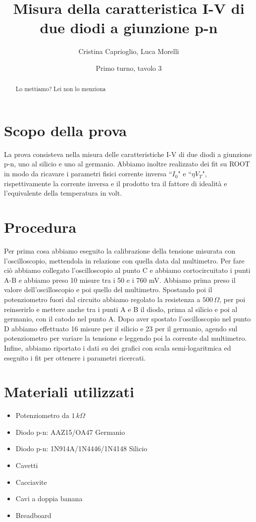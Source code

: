 \documentclass[]{article}
\title{Misura della caratteristica I-V di due diodi a giunzione p-n}
\author{Cristina Caprioglio, Luca Morelli}
\date{Primo turno, tavolo 3}
\begin{document}
\maketitle

\begin{abstract}
Lo mettiamo? Lei non lo menziona
\end{abstract}

\section{Scopo della prova}
La prova consisteva nella misura delle caratteristiche I-V di due diodi a giunzione p-n, uno al silicio e uno al germanio. Abbiamo inoltre realizzato dei fit su ROOT in modo da ricavare i parametri fisici corrente inversa ``$  I_{0}$" e ``$\eta V_{T}$", rispettivamente la corrente inversa e il prodotto tra il fattore di idealità e l'equivalente della temperatura in volt. 
\section{Procedura}
Per prima cosa abbiamo eseguito la calibrazione della tensione misurata con l'oscilloscopio, mettendola in relazione con quella data dal multimetro. Per fare ciò abbiamo collegato l'oscilloscopio al punto C e abbiamo cortocircuitato i punti A-B e abbiamo preso 10 misure tra i 50 e i 760 mV. Abbiamo prima preso il valore dell'oscilloscopio e poi quello del multimetro.
Spostando poi il potenziometro fuori dal circuito abbiamo regolato la resistenza a $ 500 \,\Omega $, per poi reinserirlo e mettere anche tra i punti A e B il diodo, prima al silicio e poi al germanio, con il catodo nel punto A. Dopo aver spostato l'oscilloscopio nel punto D abbiamo effettuato 16 misure per il silicio e 23 per il germanio, agendo sul potenziometro per variare la tensione e leggendo poi la corrente dal multimetro. Infine, abbiamo riportato i dati su dei grafici con scala semi-logaritmica ed eseguito i fit per ottenere i parametri ricercati.
\section{Materiali utilizzati}
\begin{itemize}
	\item Potenziometro da $ 1 \,k\Omega $
	\item Diodo p-n: AAZ15/OA47 Germanio
	\item Diodo p-n: 1N914A/1N4446/1N4148 Silicio
	\item Cavetti
	\item Cacciavite
	\item Cavi a doppia banana
	\item Breadboard
\end{itemize}
\end{document}
